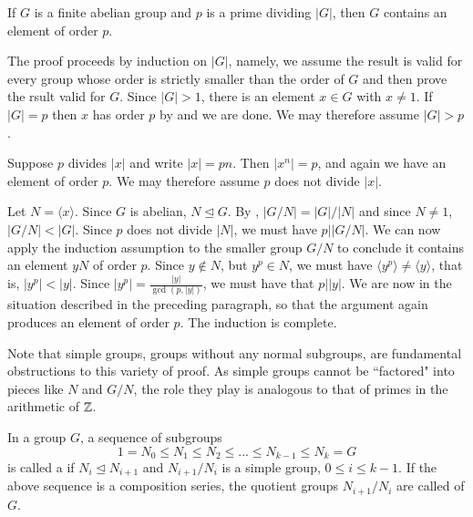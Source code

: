 \documentclass[12pt, a4paper, twoside, openright, titlepage]{book}
\begin{document}
\begin{prop}{}{}
    If $G$ is a finite abelian group and $p$ is a prime dividing $|G|$, then $G$ contains an element of order $p$.
\end{prop}
\begin{proof*}{}{}
    The proof proceeds by induction on $|G|$, namely, we assume the result is valid for every group whose order is strictly smaller than the order of $G$ and then prove the rsult valid for $G$. Since $|G| > 1$, there is an element $x \in G$ with $x \neq 1$. If $|G| = p$ then $x$ has order $p$ by  and we are done. We may therefore assume $|G| > p$.

    Suppose $p$ divides $|x|$ and write $|x| = pn$. Then $|x^n| = p$, and again we have an element of order $p$. We may therefore assume $p$ does not divide $|x|$.

    Let $N = \langle x\rangle$. Since $G$ is abelian, $N \trianglelefteq G$. By , $|G/N| = |G|/|N|$ and since $N \neq 1$, $|G/N| < |G|$. Since $p$ does not divide $|N|$, we must have $p\vert |G/N|$. We can now apply the induction assumption to the smaller group $G/N$ to conclude it contains an element $yN$ of order $p$. Since $y \notin N$, but $y^p \in N$, we must have $\langle y^p\rangle \neq \langle y\rangle$, that is, $|y^p| < |y|$. Since $|y^p| = \frac{|y|}{\gcd(p,|y|)}$, we must have that $p\vert |y|$. We are now in the situation described in the preceding paragraph, so that the argument again produces an element of order $p$. The induction is complete.
\end{proof*}

Note that simple groups, groups without any normal subgroups, are fundamental obstructions to this variety of proof. As simple groups cannot be ``factored" into pieces like $N$ and $G/N$, the role they play is analogous to that of primes in the arithmetic of $\mathbb Z$. 

\begin{defn}{}{}
    In a group $G$, a sequence of subgroups \begin{equation*}
        1 = N_0 \leq N_1 \leq N_2 \leq ... \leq N_{k-1} \leq N_k = G
    \end{equation*}
    is called a  if $N_i \trianglelefteq N_{i+1}$ and $N_{i+1}/N_i$ is a simple group, $0 \leq i \leq k-1$. If the above sequence is a composition series, the quotient groups $N_{i+1}/N_i$ are called  of $G$.
\end{defn}
\end{document}
